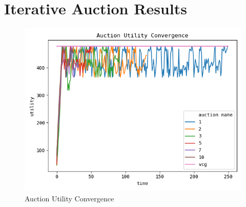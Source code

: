 \section{Iterative Auction Results}\label{sec:auctions-results}
\begin{figure}[H]
    \centering
    \includegraphics[width=1\linewidth]{../results/auction_utility_convergence.png}
    \caption{Auction Utility Convergence}
\end{figure}

